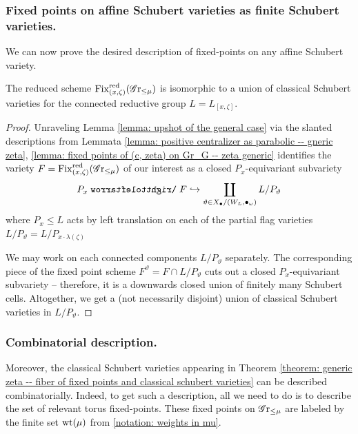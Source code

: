 \subsubsection{Fixed points on affine Schubert varieties as finite Schubert varieties.}
We can now prove the desired description of fixed-points on any affine Schubert variety.
\begin{theorem}\label{theorem: generic zeta -- fiber of fixed points and classical schubert varieties}
The reduced scheme $\operatorname{Fix}^{\operatorname{red}}_{(x, \zeta)}(\operatorname{\mathscr{G}r}_{\leq \mu})$ is isomorphic to a union of classical Schubert varieties for the connected reductive group $L = L_{[x, \zeta]}$.
\end{theorem}
\begin{proof}
Unraveling Lemma \ref{lemma: upshot of the general case} via the slanted descriptions from Lemmata \ref{lemma: positive centralizer as parabolic -- gneric zeta},  \ref{lemma: fixed points of (c, zeta) on Gr_G -- zeta generic} identifies the variety 
$F = \operatorname{Fix}^{\operatorname{red}}_{(x, \zeta)}(\operatorname{\mathscr{G}r}_{\leq \mu})$
of our interest as a closed $P_{x}$-equivariant subvariety
\begin{equation*}\label{equation: B-equivariant closed immersion into classical flag varieties -- zeta generic}
P_{x} \acts F \hookrightarrow \coprod_{\vartheta \in X_{\bullet}/(W_{L}, \bullet_{\omega})} L/P_{\vartheta}   
\end{equation*}
where $P_{x} \leq L$ acts by left translation on each of the partial flag varieties $L/P_{\vartheta} = L/P_{x \cdot \lambda(\zeta)}$

We may work on each connected components $L/P_{\vartheta}$ separately. The corresponding piece of the fixed point scheme $F^{\vartheta} = F \cap L/P_{\vartheta}$ cuts out a closed $P_{x}$-equivariant subvariety -- therefore, it is a downwards closed union of finitely many Schubert cells. Altogether, we get a (not necessarily disjoint) union of classical Schubert varieties in $L/P_{\vartheta}$.
\end{proof}


\subsubsection{Combinatorial description.}
Moreover, the classical Schubert varieties appearing in Theorem \ref{theorem: generic zeta -- fiber of fixed points and classical schubert varieties} can be described combinatorially. Indeed, to get such a description, all we need to do is to describe the set of relevant torus fixed-points. 
%
These fixed points on $\operatorname{\mathscr{G}r}_{\leq \mu}$ are labeled by the finite set $\operatorname{wt}(\mu)$ from \eqref{notation: weights in mu}.

